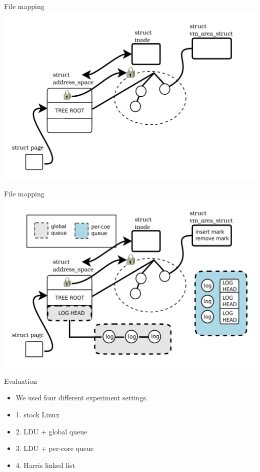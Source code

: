 \documentclass[english]{beamer} %
\begin{document}
\begin{frame}{File mapping}
\includegraphics[scale=0.5]{fig/file_rmap_default}
\end{frame}


\begin{frame}{File mapping}
\includegraphics[scale=0.5]{fig/file_rmap}
\end{frame}



\begin{frame}{Evaluation}
    \begin{itemize}[<+-| alert@+>]
    \item We used four different experiment settings.
    \item 1. stock Linux
    \item 2. LDU + global queue
    \item 3. LDU + per-core queue
    \item 4. Harris linked list
    \end{itemize}
\end{frame}
\end{document}

